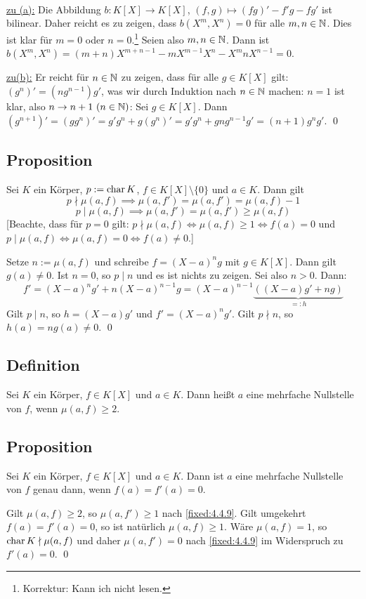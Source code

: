 \proof ~

\underline{zu (a):} Die Abbildung $b : K[X] \to K[X]$, $(f,g) \mapsto (fg)'-f'g-fg'$ ist bilinear. Daher reicht es zu zeigen, dass $b(X^m,X^n) = 0$ für alle $m,n \in \mathbb N$. Dies ist klar für $m=0$ oder $n=0$.\footnote{Korrektur: Kann ich nicht lesen.} Seien also $m,n \in \mathbb N$. Dann ist $b(X^m,X^n) = (m+n)X^{m+n-1} - mX^{m-1}X^n - X^mnX^{n-1} = 0$.

\underline{zu(b):} Er reicht für $n \in \mathbb N$ zu zeigen, dass für alle $g \in K[X]$ gilt: $(g^n)' = (ng^{n-1})g'$, was wir durch Induktion nach $n \in \mathbb N$ machen: $n = 1$ ist klar, also $n \to n+1~(n \in \mathbb N)$: Sei $g \in K[X]$. Dann $(g^{n+1})' = (gg^n)' = g'g^n + g(g^n)' = g'g^n + gng^{n-1}g' = (n+1)g^ng'$. \qed

\subsection{Proposition} Sei $K$ ein Körper, $p := \operatorname{char} K$, $f \in K[X] \setminus \{0\}$ und $a \in K$. Dann gilt
$$p \nmid \mu(a,f) \implies \mu(a,f') = \mu(a,f') = \mu(a,f)-1$$
$$p \mid \mu(a,f) \implies \mu(a,f') = \mu(a,f') \geq \mu(a,f)$$
[Beachte, dass für $p =0$ gilt: $p \nmid \mu(a,f) \iff \mu(a,f) \geq 1 \iff f(a)=0$ und $p \mid \mu(a,f) \iff \mu(a,f)=0 \iff f(a) \neq 0$.]

\proof Setze $n := \mu(a,f)$ und schreibe $f = (X-a)^n g$ mit $g \in K[X]$. Dann gilt $g(a) \neq 0$. Ist $n=0$, so $p \mid n$ und es ist nichts zu zeigen. Sei also $n>0$. Dann:
$$f' = (X-a)^n g' + n(X-a)^{n-1} g = (X-a)^{n-1} \underbrace{((X-a) g' + ng)}_{=:h}$$
Gilt $p \mid n$, so $h = (X-a)g'$ und $f' = (X-a)^ng'$. Gilt $p \nmid n$, so $h(a) = ng(a) \neq 0$. \qed

\subsection{Definition} Sei $K$ ein Körper, $f \in K[X]$ und $a \in K$. Dann heißt $a$ eine mehrfache Nullstelle von $f$, wenn $\mu(a,f) \geq 2$.

\subsection{Proposition} Sei $K$ ein Körper, $f \in K[X]$ und $a \in K$. Dann ist $a$ eine mehrfache Nullstelle von $f$ genau dann, wenn $f(a) = f'(a) = 0$.

\proof Gilt $\mu(a,f) \geq 2$, so $\mu(a,f') \geq 1$ nach \ref{fixed:4.4.9}. Gilt umgekehrt $f(a) = f'(a)=0$, so ist natürlich $\mu(a,f) \geq 1$. Wäre $\mu(a,f)=1$, so $\operatorname{char} K \nmid \mu(a,f)$ und daher $\mu(a,f') = 0$ nach \ref{fixed:4.4.9} im Widerspruch zu $f'(a)=0$. \qed

